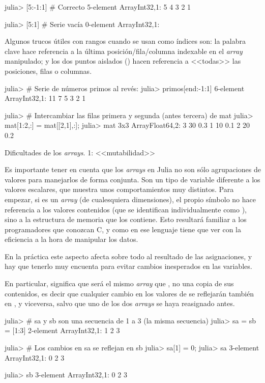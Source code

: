 ﻿\documentclass[spanish]{article}
\begin{document}
julia> {[}5:-1:1{]} \# Correcto
5-element Array{Int32,1}:
 5
 4
 3
 2
 1 

julia> {[}5:1{]} \# Serie vacía
0-element Array{Int32,1}:

Algunos trucos útiles con rangos cuando se usan como índices son:
la palabra clave  hace referencia a la última posición/fila/columna
indexable en el \emph{array} manipulado; y los dos puntos aislados
(\code{:}) hacen referencia a <<todas>> las posiciones, filas
o columnas.

julia> \# Serie de números primos al revés:
julia> primos{[}end:-1:1{]}
6-element Array{Int32,1}:
 11
 7
 5
 3
 2
 1

julia> \# Intercambiar las filas primera y segunda (antes tercera) de mat
julia> mat{[}1:2,:{]} = mat{[}{[}2,1{]},:{]};
julia> mat
3x3 Array{Float64,2}:
 3 30 0.3
 1 10 0.1
 2 20 0.2

Dificultades de los \emph{arrays}. 1: <<mutabilidad>>

Es importante tener en cuenta que los \emph{arrays} en Julia no son
sólo agrupaciones de valores para manejarlos de forma conjunta. Son
un tipo de variable diferente a los valores escalares, que muestra
unos comportamientos muy distintos. Para empezar, si  es
un \emph{array} (de cualesquiera dimensiones), el propio símbolo 
no hace referencia a los valores contenidos (que se identifican individualmente
como ), sino a la estructura de memoria que los contiene.
Esto resultará familiar a los programadores que conozcan C, y como
en ese lenguaje tiene que ver con la eficiencia a la hora de manipular
los datos.

En la práctica este aspecto afecta sobre todo al resultado de las
asignaciones, y hay que tenerlo muy encuenta para evitar cambios inesperados
en las variables.

En particular,  significa que  será el mismo
\emph{array} que , no una copia de sus contenidos, es decir
que cualquier cambio en los valores de  se reflejarán también
en , y viceversa, salvo que uno de los dos \emph{arrays}
se haya reasignado antes.

julia> \# sa y sb son una secuencia de 1 a 3 (la misma secuencia)
julia> sa = sb = {[}1:3{]}
2-element Array{Int32,1}:
 1 2 3

julia> \# Los cambios en sa se reflejan en sb
julia> sa{[}1{]} = 0;
julia> sa
3-element Array{Int32,1}:
 0 2 3

julia> sb 3-element
Array{Int32,1}:
 0 2 3
\end{document}
